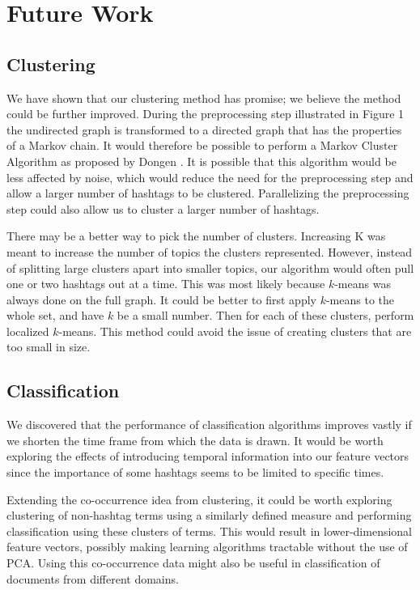 

\section{Future Work}

\subsection{Clustering}
We have shown that our clustering method has promise; we believe the method could be further improved. During the preprocessing step illustrated in Figure 1 the undirected graph is transformed to a directed graph that has the properties of a Markov chain. It would therefore be possible to perform a Markov Cluster Algorithm as proposed by Dongen \cite{Dongen2000}. It is possible that this algorithm would be less affected by noise, which would reduce the need for the preprocessing step and allow a larger number of hashtags to be clustered. Parallelizing the preprocessing step could also allow us to cluster a larger number of hashtags.

There may be a better way to pick the number of clusters. Increasing K was meant to increase the number of topics the clusters represented. However, instead of splitting large clusters apart into smaller topics, our algorithm would often pull one or two hashtags out at a time. This was most likely because $k$-means was always done on the full graph. It could be better to first apply $k$-means to the whole set, and have $k$ be a small number. Then for each of these clusters, perform localized $k$-means. This method could avoid the issue of creating clusters that are too small in size. 

\subsection{Classification}
We discovered that the performance of classification algorithms improves vastly if we shorten the time frame from which the data is drawn. It would be worth exploring the effects of introducing temporal information into our feature vectors since the importance of some hashtags seems to be limited to specific times.

Extending the co-occurrence idea from clustering, it could be worth exploring clustering of non-hashtag terms using a similarly defined measure and performing classification using these clusters of terms. This would result in lower-dimensional feature vectors, possibly making learning algorithms tractable without the use of PCA. Using this co-occurrence data might also be useful in classification of documents from different domains.

